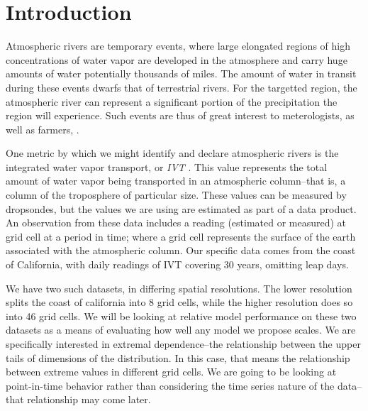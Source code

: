 
\section{Introduction}
Atmospheric rivers are temporary events, where large elongated regions of high concentrations of
  water vapor are developed in the atmosphere and carry huge amounts of water potentially thousands
  of miles.  The amount of water in transit during these events dwarfs that of terrestrial rivers.
  For the targetted region, the atmospheric river can represent a significant portion of the
  precipitation the region will experience.  Such events are thus of great interest to meterologists,
  as well as farmers, .

One metric by which we might identify and declare atmospheric rivers is the integrated water vapor
  transport, or \emph{IVT}
  .  This value represents the total amount of water vapor being transported
  in an atmospheric column--that is, a column of the troposphere of particular size. These values
  can be measured by dropsondes, but the values we are using are estimated as part of a data
  product.  An observation from these data includes a reading (estimated
  or measured) at grid cell at a period in time; where a grid cell represents the surface of the
  earth associated with the atmospheric column.  Our specific data comes from the coast of California,
  with daily readings of IVT covering 30 years, omitting leap days.

We have two such datasets, in differing spatial resolutions.  The lower resolution splits the coast
  of california into 8 grid cells, while the higher resolution does so into 46 grid cells.
  We will be looking at relative model performance on these two datasets as a means of evaluating
  how well any model we propose scales.  We are specifically interested in extremal dependence--the
  relationship between the upper tails of dimensions of the distribution.  In this case, that means
  the relationship between extreme values in different grid cells.  We are going to be looking at
  point-in-time behavior rather than considering the time series nature of the data--that
  relationship may come later.

